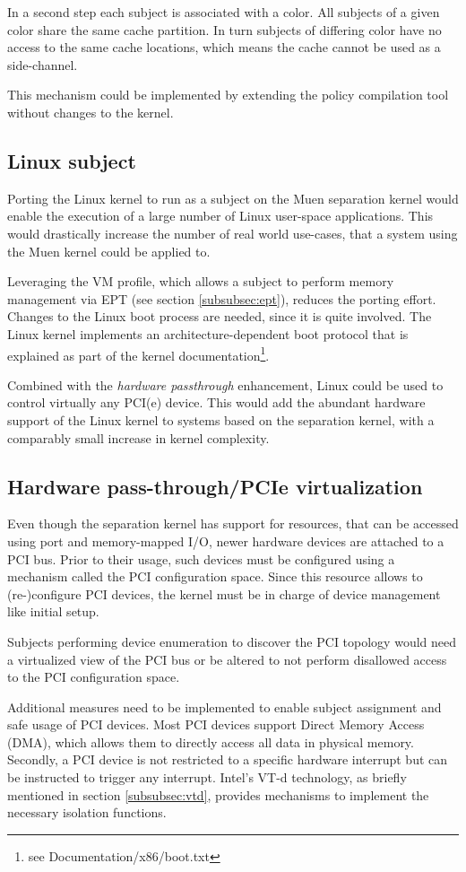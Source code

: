 In a second step each subject is associated with a color. All subjects of a
given color share the same cache partition. In turn subjects of differing color
have no access to the same cache locations, which means the cache cannot be used
as a side-channel.

This mechanism could be implemented by extending the policy compilation tool
without changes to the kernel.

\subsection{Linux subject}
Porting the Linux kernel to run as a subject on the Muen separation kernel would
enable the execution of a large number of Linux user-space applications. This
would drastically increase the number of real world use-cases, that a system
using the Muen kernel could be applied to.

Leveraging the VM profile, which allows a subject to perform memory management
via EPT (see section \ref{subsubsec:ept}), reduces the porting effort. Changes
to the Linux boot process are needed, since it is quite involved. The Linux
kernel implements an architecture-dependent boot protocol that is explained as
part of the kernel documentation\footnote{see Documentation/x86/boot.txt}.

Combined with the \emph{hardware passthrough} enhancement, Linux could be used
to control virtually any PCI(e) device. This would add the abundant hardware
support of the Linux kernel to systems based on the separation kernel, with a
comparably small increase in kernel complexity.

\subsection{Hardware pass-through/PCIe virtualization}
Even though the separation kernel has support for resources, that can be
accessed using port and memory-mapped I/O, newer hardware devices are attached
to a PCI bus. Prior to their usage, such devices must be configured using a
mechanism called the PCI configuration space. Since this resource allows to
(re-)configure PCI devices, the kernel must be in charge of device management
like initial setup.

Subjects performing device enumeration to discover the PCI topology would need
a virtualized view of the PCI bus or be altered to not perform disallowed access
to the PCI configuration space.

Additional measures need to be implemented to enable subject assignment and safe
usage of PCI devices. Most PCI devices support Direct Memory Access (DMA), which
allows them to directly access all data in physical memory. Secondly, a PCI
device is not restricted to a specific hardware interrupt but can be instructed
to trigger any interrupt. Intel's VT-d technology, as briefly mentioned in
section \ref{subsubsec:vtd}, provides mechanisms to implement the necessary
isolation functions.

